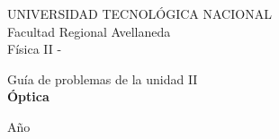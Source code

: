 
\begin{titlepage}
\begin{figure}[ht]
\begin{center}
\vspace{1.5cm}

% 

\vspace{-1cm}
\end{center}
\end{figure}

\begin{center}
{\LARGE UNIVERSIDAD TECNOLÓGICA NACIONAL}\\
\vspace{0.25cm}
{\LARGE Facultad Regional Avellaneda}\\
\vspace{1cm}
{\Huge Física II - \comision}

\vspace{1.5cm} {\LARGE Guía de problemas de la unidad II}\\
\vspace{1cm}
{\Huge \bf \color[RGB]{255,128,0} Óptica}


\vspace*{\fill}
\vspace{0.75cm} {Año \anio}
\vspace{0.75cm}


\end{center}


\end{titlepage}

\newpage
{}
\tableofcontents

\newpage
{}
